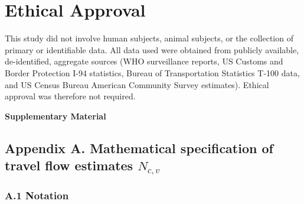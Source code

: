 \documentclass[12pt, a4paper]{article}
\begin{document}
\section*{Ethical Approval}
This study did not involve human subjects, animal subjects, or the collection of primary or identifiable data. All data used were obtained from publicly available, de-identified, aggregate sources (WHO surveillance reports, US Customs and Border Protection I-94 statistics, Bureau of Transportation Statistics T-100 data, and US Census Bureau American Community Survey estimates). Ethical approval was therefore not required.




\newpage

\begin{center}
{\large\bfseries Supplementary Material}
\end{center}

\subsection*{Appendix A. Mathematical specification of travel flow
estimates $N_{c,v}$}

\subsubsection*{A.1 Notation}
\end{document}
